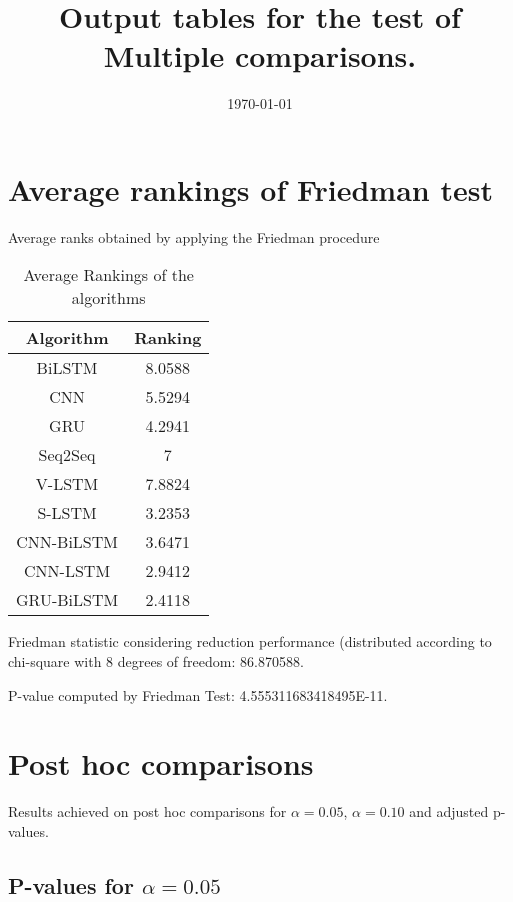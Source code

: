 \documentclass[a4paper,10pt]{article}
\title{Output tables for the test of Multiple comparisons.}
\author{}
\date{\today}
\begin{document}
\begin{landscape}
\pagestyle{empty}
\maketitle
\thispagestyle{empty}
\section{Average rankings of Friedman test}



Average ranks obtained by applying the Friedman procedure

\begin{table}[!htp]
\centering
\begin{tabular}{|c|c|}\hline
Algorithm&Ranking\\\hline
BiLSTM & 8.0588\\
CNN & 5.5294\\
GRU & 4.2941\\
Seq2Seq & 7\\
V-LSTM & 7.8824\\
S-LSTM & 3.2353\\
CNN-BiLSTM & 3.6471\\
CNN-LSTM & 2.9412\\
GRU-BiLSTM & 2.4118\\
\hline
\end{tabular}
\caption{Average Rankings of the algorithms}
\end{table}

Friedman statistic considering reduction performance (distributed according to chi-square with 8 degrees of freedom: 86.870588.

P-value computed by Friedman Test: 4.555311683418495E-11.\newline



\pagebreak

\section{Post hoc comparisons}

Results achieved on post hoc comparisons for $\alpha = 0.05$, $\alpha = 0.10$ and adjusted p-values.

\subsection{P-values for $\alpha=0.05$}


\end{landscape}
\end{document}
